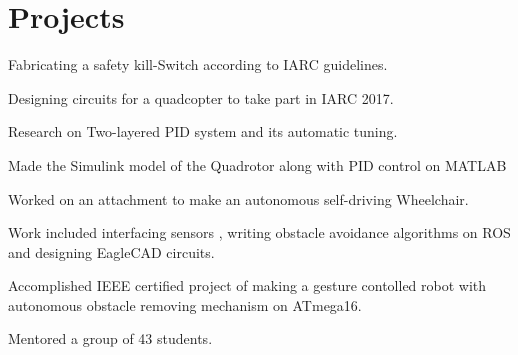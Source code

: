 \documentclass[letterpaper]{deedy-resume} %
\begin{document}
\begin{minipage}[t]{0.66\textwidth} %


\section{Projects}


\vspace{\topsep} %
\begin{tightitemize}
\item Fabricating a safety kill-Switch according to IARC guidelines.
\item Designing circuits for a quadcopter to take part in IARC 2017.
\item Research on Two-layered PID system and its automatic tuning.
\item Made the Simulink model of the Quadrotor along with PID control on MATLAB
\end{tightitemize}

\sectionspace %



\begin{tightitemize}
\item Worked on an attachment to make an autonomous self-driving Wheelchair.
\item Work included interfacing sensors , writing obstacle avoidance algorithms on ROS and designing EagleCAD circuits.
\end{tightitemize}

\sectionspace %



\begin{tightitemize}
\item Accomplished IEEE certified project of making a gesture contolled robot with autonomous obstacle removing mechanism on ATmega16.
\item Mentored a group of 43 students.
\end{tightitemize}


\end{minipage}
\end{document}
